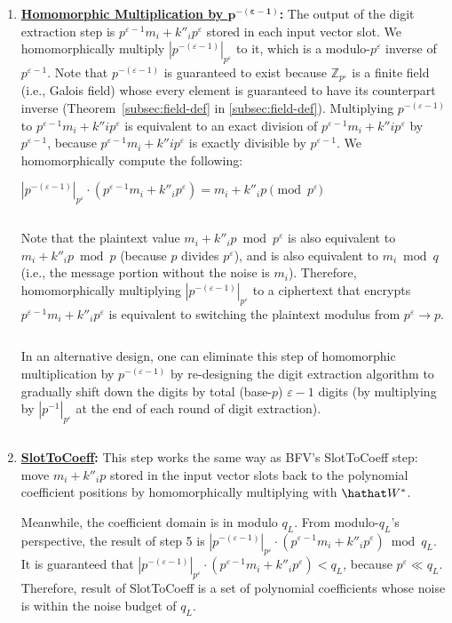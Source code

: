 \begin{enumerate}
\item \textbf{\underline{Homomorphic Multiplication by $\bm{p^{-(\varepsilon-1)}}$}:} 
The output of the digit extraction step is $p^{\varepsilon-1}m_i + k''_ip^\varepsilon$ stored in each input vector slot. We homomorphically multiply $|p^{-(\varepsilon-1)}|_{p^\varepsilon}$ to it, which is a modulo-$p^\varepsilon$ inverse of $p^{\varepsilon-1}$. 
Note that $p^{-(\varepsilon-1)}$ is guaranteed to exist because $\mathbb{Z}_{p^\varepsilon}$ is a finite field (i.e., Galois field) whose every element is guaranteed to have its counterpart inverse (Theorem~\ref*{subsec:field-def} in \autoref{subsec:field-def}). Multiplying $p^{-(\varepsilon-1)}$ to $p^{\varepsilon-1}m_i + k''ip^\varepsilon$ is equivalent to an exact division of $p^{\varepsilon-1}m_i + k''ip^\varepsilon$ by $p^{\varepsilon-1}$, because $p^{\varepsilon-1}m_i + k''ip^\varepsilon$ is exactly divisible by $p^{\varepsilon-1}$. We homomorphically compute the following:

$|p^{-(\varepsilon-1)}|_{p^\varepsilon} \cdot (p^{\varepsilon-1}m_i + k''_ip^\varepsilon) = m_i + k''_ip \pmod{p^\varepsilon}$ 

$ $

Note that the plaintext value $m_i + k''_ip \bmod p^\varepsilon$ is also equivalent to $m_i + k''_ip \bmod p$ (because $p$ divides $p^\varepsilon$), and is also equivalent to $m_i \bmod q$ (i.e., the message portion without the noise is $m_i$). Therefore, homomorphically multiplying $|p^{-(\varepsilon-1)}|_{p^\varepsilon}$ to a ciphertext that encrypts $p^{\varepsilon-1}m_i + k''_ip^\varepsilon$ is equivalent to switching the plaintext modulus from $p^\varepsilon \rightarrow p$. 

$ $

In an alternative design, one can eliminate this step of homomorphic multiplication by $p^{-(\varepsilon-1)}$ by re-designing the digit extraction algorithm to gradually shift down the digits by total (base-$p$) $\varepsilon-1$ digits (by multiplying by $|p^{-1}|_{p^{\varepsilon}}$ at the end of each round of digit extraction). 


$ $


\item \textbf{\textsf{\underline{SlotToCoeff}}:} This step works the same way as BFV's \textsf{SlotToCoeff} step: move $m_i + k''_ip$ stored in the input vector slots back to the polynomial coefficient positions by homomorphically multiplying with $\hathat W^*$. 

Meanwhile, the coefficient domain is in modulo $q_L$. From modulo-$q_L$'s perspective, the result of step 5 is $|p^{-(\varepsilon-1)}|_{p^\varepsilon} \cdot (p^{\varepsilon-1}m_i + k''_ip^\varepsilon) \bmod q_L$. It is guaranteed that $|p^{-(\varepsilon-1)}|_{p^\varepsilon} \cdot (p^{\varepsilon-1}m_i + k''_ip^\varepsilon) < q_L$, because $p^\varepsilon \ll q_L$. Therefore, result of \textsf{SlotToCoeff} is a set of polynomial coefficients whose noise is within the noise budget of $q_L$. 


\end{enumerate}
